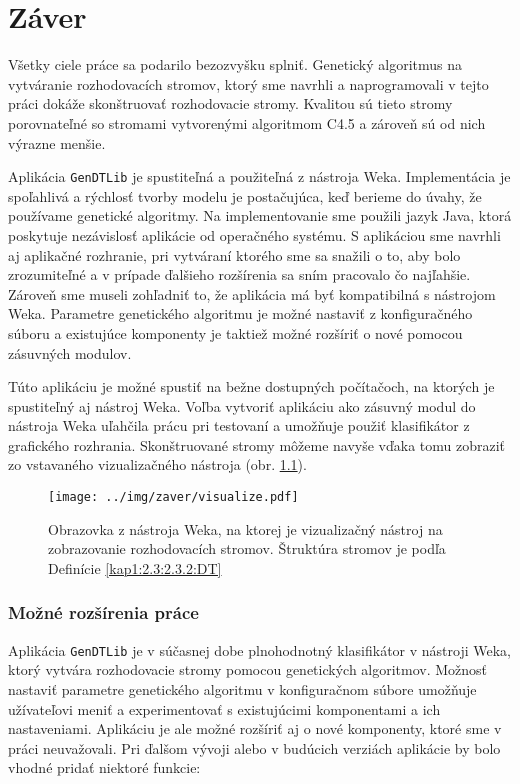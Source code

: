 \chapter{Záver}\label{kap:fin}
\renewcommand{\figurename}{Obrázok}
Všetky ciele práce sa podarilo bezozvyšku splniť. Genetický algoritmus na vytváranie rozhodovacích stromov, ktorý sme navrhli a naprogramovali v tejto práci dokáže skonštruovať rozhodovacie stromy. Kvalitou sú tieto stromy porovnateľné so stromami vytvorenými algoritmom C4.5 a zároveň sú od nich výrazne menšie.



Aplikácia \verb|GenDTLib| je spustiteľná a použiteľná z nástroja Weka. Implementácia je spoľahlivá a rýchlosť tvorby modelu je postačujúca, keď berieme do úvahy, že používame genetické algoritmy. Na implementovanie sme použili jazyk Java, ktorá poskytuje nezávislosť aplikácie od operačného systému. S aplikáciou sme navrhli aj aplikačné rozhranie, pri vytváraní ktorého sme sa snažili o to, aby bolo zrozumiteľné a v prípade ďalšieho rozšírenia sa sním pracovalo čo najľahšie. Zároveň sme museli zohľadniť to, že aplikácia má byť kompatibilná s nástrojom Weka. Parametre genetického algoritmu je možné nastaviť z konfiguračného súboru a existujúce komponenty je taktiež možné rozšíriť o nové pomocou zásuvných modulov.

Túto aplikáciu je možné spustiť na bežne dostupných počítačoch, na ktorých je spustiteľný aj nástroj Weka. 
Voľba vytvoriť aplikáciu ako zásuvný modul do nástroja Weka uľahčila prácu pri testovaní a umožňuje použiť klasifikátor z grafického rozhrania. Skonštruované stromy môžeme navyše vďaka tomu zobraziť zo vstavaného vizualizačného nástroja (obr. \ref{fig:wekatree}).

\begin{figure}[h]
\centering
\centerline{\mbox{\texttt{[image: ../img/zaver/visualize.pdf]}}}
\caption{Obrazovka z nástroja Weka, na ktorej je vizualizačný nástroj na zobrazovanie rozhodovacích stromov. Štruktúra stromov je podľa Definície \ref{kap1:2.3:2.3.2:DT}}\label{fig:wekatree}
\end{figure}

\subsection{Možné rozšírenia práce}
Aplikácia \verb|GenDTLib| je v súčasnej dobe plnohodnotný klasifikátor v nástroji Weka, ktorý vytvára rozhodovacie stromy pomocou genetických algoritmov. Možnosť nastaviť parametre genetického algoritmu v konfiguračnom súbore umožňuje užívateľovi meniť a experimentovať s existujúcimi komponentami a ich nastaveniami. Aplikáciu je ale možné rozšíriť aj o nové komponenty, ktoré sme v práci neuvažovali. Pri ďalšom vývoji alebo v budúcich verziách aplikácie by bolo vhodné pridať niektoré funkcie:

